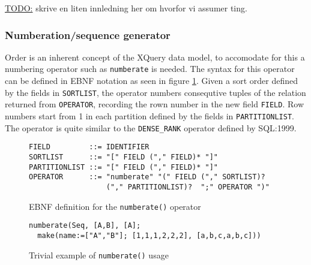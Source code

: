 \underline{\LARGE TODO:} skrive en liten innledning her om hvorfor vi assumer ting.

\subsubsection{Numberation/sequence generator}
Order is an inherent concept of the XQuery data model, to accomodate for this a numbering operator such as
\texttt{numberate} is needed. The syntax for this operator can be defined in EBNF notation as seen in figure
\ref{figure:mql:numberate_ebnf}. Given a sort order defined by the fields in \texttt{SORTLIST}, the operator
numbers consequtive tuples of the relation returned from \texttt{OPERATOR}, recording the rown number in the new
field \texttt{FIELD}. Row numbers start from 1 in each partition defined by the fields in \texttt{PARTITIONLIST}.
The operator is quite similar to the \texttt{DENSE_RANK} operator defined by SQL:1999\cite{sqlbook}.

\begin{figure}[!h]
\begin{center}
\begin{Verbatim}
FIELD         ::= IDENTIFIER
SORTLIST      ::= "[" FIELD ("," FIELD)* "]"
PARTITIONLIST ::= "[" FIELD ("," FIELD)* "]"
OPERATOR      ::= "numberate" "(" FIELD ("," SORTLIST)? 
                  ("," PARTITIONLIST)?  ";" OPERATOR ")"
\end{Verbatim}
  \caption{EBNF definition for the \texttt{numberate()} operator}
  \label{figure:mql:numberate_ebnf}
\end{center}
\end{figure}

\begin{figure}[!h]
\begin{center}
\begin{Verbatim}
numberate(Seq, [A,B], [A];
  make(name:=["A","B"]; [1,1,1,2,2,2], [a,b,c,a,b,c]))
\end{Verbatim}
  \caption{Trivial example of \texttt{numberate()} usage}
  \label{figure:mql:numberate_example}
\end{center}
\end{figure}

